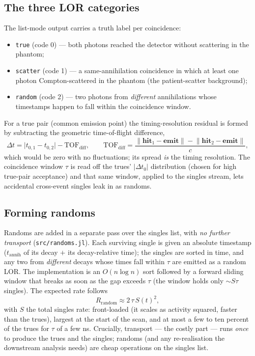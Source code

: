 \documentclass[11pt]{article}
\begin{document}
\subsection{The three LOR categories}
The list-mode output carries a truth label per coincidence:
\begin{itemize}[nosep]
\item \texttt{true} (code 0) --- both photons reached the detector without scattering in the
phantom;
\item \texttt{scatter} (code 1) --- a same-annihilation coincidence in which at least one
photon Compton-scattered in the phantom (the patient-scatter background);
\item \texttt{random} (code 2) --- two photons from \emph{different} annihilations whose
timestamps happen to fall within the coincidence window.
\end{itemize}
For a true pair (common emission point) the timing-resolution residual is formed by
subtracting the geometric time-of-flight difference,
\begin{equation}
\Delta t = \bigl|t_{0,1}-t_{0,2}\bigr| - \mathrm{TOF}_{\mathrm{diff}}, \qquad
\mathrm{TOF}_{\mathrm{diff}} = \frac{\lVert \mathbf{hit}_1-\mathbf{emit}\rVert
- \lVert \mathbf{hit}_2-\mathbf{emit}\rVert}{c},
\end{equation}
which would be zero with no fluctuations; its spread \emph{is} the timing resolution. The
coincidence window $\tau$ is read off the trues' $|\Delta t_0|$ distribution (chosen for high
true-pair acceptance) and that same window, applied to the singles stream, lets accidental
cross-event singles leak in as randoms.

\subsection{Forming randoms}
Randoms are added in a separate pass over the singles list, with \emph{no further transport}
(\texttt{src/randoms.jl}). Each surviving single is given an absolute timestamp
($t_{\mathrm{annih}}$ of its decay $+$ its decay-relative time); the singles are sorted in
time, and any two from \emph{different} decays whose times fall within $\tau$ are emitted as a
random LOR. The implementation is an $O(n\log n)$ sort followed by a forward sliding window
that breaks as soon as the gap exceeds $\tau$ (the window holds only $\sim S\tau$ singles).
The expected rate follows
\begin{equation}
R_{\mathrm{random}} \approx 2\,\tau\,S(t)^2,
\end{equation}
with $S$ the total singles rate: front-loaded (it scales as activity squared, faster than
the trues), largest at the start of the scan, and at most a few to ten percent of the trues
for $\tau$ of a few ns. Crucially, transport --- the costly part --- runs \emph{once} to
produce the trues and the singles; randoms (and any re-realisation the downstream analysis
needs) are cheap operations on the singles list.
\end{document}
